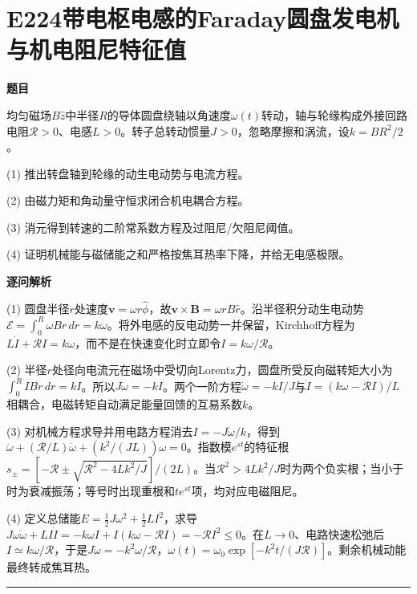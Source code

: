 \documentclass[UTF8,a4paper,11pt,oneside,openany]{ctexbook}
\begin{document}
\section*{E224\quad 带电枢电感的Faraday圆盘发电机与机电阻尼特征值}
\textbf{题目}\par
均匀磁场$B\hat z$中半径$R$的导体圆盘绕轴以角速度$\omega(t)$转动，轴与轮缘构成外接回路电阻$\mathcal R>0$、电感$L>0$。转子总转动惯量$J>0$，忽略摩擦和涡流，设$k=BR^2/2$。
\par\smallskip\noindent (1) 推出转盘轴到轮缘的动生电动势与电流方程。
\par\smallskip\noindent (2) 由磁力矩和角动量守恒求闭合机电耦合方程。
\par\smallskip\noindent (3) 消元得到转速的二阶常系数方程及过阻尼/欠阻尼阈值。
\par\smallskip\noindent (4) 证明机械能与磁储能之和严格按焦耳热率下降，并给无电感极限。
\par\medskip\textbf{逐问解析}\par
\par\smallskip\noindent (1) 圆盘半径$r$处速度$\boldsymbol v=\omega r\hat\phi$，故$\boldsymbol v\times\boldsymbol B=\omega rB\hat r$。沿半径积分动生电动势$\mathcal E=\int_0^R\omega Br\,dr=k\omega$。将外电感的反电动势一并保留，Kirchhoff方程为$L\dot I+\mathcal RI=k\omega$，而不是在快速变化时立即令$I=k\omega/\mathcal R$。
\par\smallskip\noindent (2) 半径$r$处径向电流元在磁场中受切向Lorentz力，圆盘所受反向磁转矩大小为$\int_0^R IBr\,dr=kI$。所以$J\dot\omega=-kI$。两个一阶方程$\dot\omega=-kI/J$与$\dot I=(k\omega-\mathcal RI)/L$相耦合，电磁转矩自动满足能量回馈的互易系数$k$。
\par\smallskip\noindent (3) 对机械方程求导并用电路方程消去$I=-J\dot\omega/k$，得到$\ddot\omega+(\mathcal R/L)\dot\omega+(k^2/(JL))\omega=0$。指数模$e^{st}$的特征根$s_\pm=[-\mathcal R\pm\sqrt{\mathcal R^2-4Lk^2/J}]/(2L)$。当$\mathcal R^2>4Lk^2/J$时为两个负实根；当小于时为衰减振荡；等号时出现重根和$t e^{st}$项，均对应电磁阻尼。
\par\smallskip\noindent (4) 定义总储能$E=\tfrac12J\omega^2+\tfrac12LI^2$，求导$J\omega\dot\omega+LI\dot I=-k\omega I+I(k\omega-\mathcal RI)=-\mathcal RI^2\le0$。在$L\to0$、电路快速松弛后$I\simeq k\omega/\mathcal R$，于是$J\dot\omega=-k^2\omega/\mathcal R$，$\omega(t)=\omega_0\exp[-k^2t/(J\mathcal R)]$。剩余机械动能最终转成焦耳热。
\par\medskip\hrule\medskip
\end{document}
